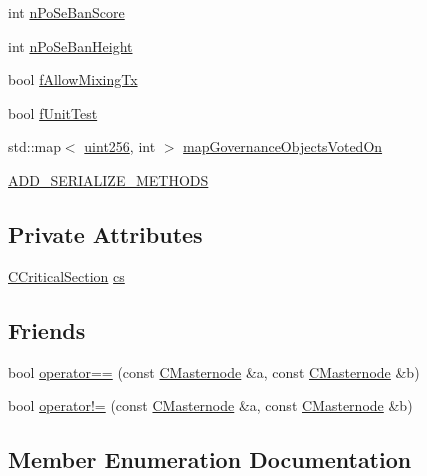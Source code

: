 \begin{DoxyCompactItemize}
\item 
int \mbox{\hyperlink{class_c_masternode_aa0a7406aa8ea8a159af7ff719bfc1f8c}{n\+Po\+Se\+Ban\+Score}}
\item 
int \mbox{\hyperlink{class_c_masternode_aaab93ec5854e042fae8804d4bf50e35d}{n\+Po\+Se\+Ban\+Height}}
\item 
bool \mbox{\hyperlink{class_c_masternode_aec0ac0226c4e0d6ee3f9a084a8e311ea}{f\+Allow\+Mixing\+Tx}}
\item 
bool \mbox{\hyperlink{class_c_masternode_a8a35685b1e8220a45d8c148753a51572}{f\+Unit\+Test}}
\item 
std\+::map$<$ \mbox{\hyperlink{classuint256}{uint256}}, int $>$ \mbox{\hyperlink{class_c_masternode_a3b0131c0ee2ba77e5c67dd0445b202bf}{map\+Governance\+Objects\+Voted\+On}}
\item 
\mbox{\hyperlink{class_c_masternode_adbd6c5c459a6450cd724f88d62b5948f}{A\+D\+D\+\_\+\+S\+E\+R\+I\+A\+L\+I\+Z\+E\+\_\+\+M\+E\+T\+H\+O\+DS}}
\end{DoxyCompactItemize}
\subsection*{Private Attributes}
\begin{DoxyCompactItemize}
\item 
\mbox{\hyperlink{sync_8h_a37a4692b2d517f2843655ca11af7668a}{C\+Critical\+Section}} \mbox{\hyperlink{class_c_masternode_a0b67bc1bebc7dfeb29dc545cb12d286f}{cs}}
\end{DoxyCompactItemize}
\subsection*{Friends}
\begin{DoxyCompactItemize}
\item 
bool \mbox{\hyperlink{class_c_masternode_ac3549be50afdc1acd8be9a763cb7b355}{operator==}} (const \mbox{\hyperlink{class_c_masternode}{C\+Masternode}} \&a, const \mbox{\hyperlink{class_c_masternode}{C\+Masternode}} \&b)
\item 
bool \mbox{\hyperlink{class_c_masternode_ab717eb8dbdf0438855bd30eb922fe73a}{operator!=}} (const \mbox{\hyperlink{class_c_masternode}{C\+Masternode}} \&a, const \mbox{\hyperlink{class_c_masternode}{C\+Masternode}} \&b)
\end{DoxyCompactItemize}


\subsection{Member Enumeration Documentation}
\mbox{\label{class_c_masternode_a958e9e8587729e417d1a529c81bf2eb0}} 
